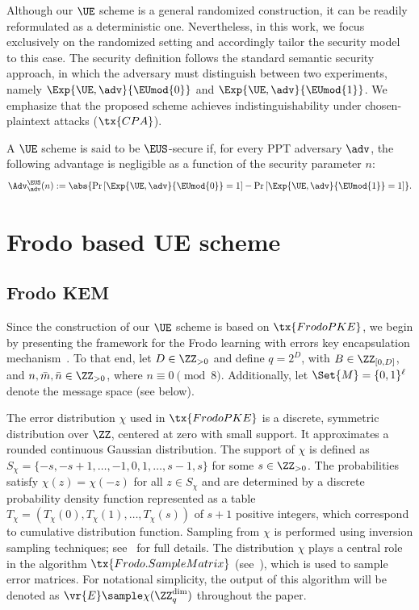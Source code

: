 \documentclass{fundam}
\begin{document}
Although our $\UE$ scheme is a general randomized construction, it can be readily reformulated as a deterministic one. Nevertheless, in this work, we focus exclusively on the randomized setting and accordingly tailor the security model to this case. The security definition follows the standard semantic security approach, in which the adversary must distinguish between two experiments, namely $\Exp{\UE,\adv}{\EUmod{0}}$ and $\Exp{\UE,\adv}{\EUmod{1}}$. We emphasize that the proposed scheme achieves indistinguishability under chosen-plaintext attacks ($\tx{CPA}$).

A $\UE$ scheme is said to be $\EUS$-secure if, for every PPT adversary $\adv$, the following advantage is negligible as a function of the security parameter $n$:
\begin{align*}
	\Adv_{\adv}^{\EUS}(n) := \abs{\Pr\left[ \Exp{\UE,\adv}{\EUmod{0}} = 1 \right] - \Pr\left[ \Exp{\UE,\adv}{\EUmod{1}} = 1 \right]}.
\end{align*}



\section{Frodo based UE scheme}
\subsection{Frodo KEM}\label{sec::Frodo}
Since the construction of our $\UE$ scheme is based on $\tx{FrodoPKE}$, we begin by presenting the framework for the Frodo learning with errors key encapsulation mechanism~\cite{Frodo, Frodo2}. To that end, let $D \in \ZZ_{>0}$ and define $q = 2^D$, with $B \in \ZZ_{[0, D]}$, and $n, \bar{m}, \bar{n} \in \ZZ_{>0}$, where $n \equiv 0 \pmod{8}$. Additionally, let $\Set{M} = \{0,1\}^{\ell}$ denote the message space (see below).


The error distribution $\chi$ used in $\tx{FrodoPKE}$ is a discrete, symmetric distribution over $\ZZ$, centered at zero with small support. It approximates a rounded continuous Gaussian distribution. The support of $\chi$ is defined as $S_{\chi} = \{-s, -s+1, \ldots, -1, 0, 1, \ldots, s-1, s\}$ for some $s \in \ZZ_{>0}$. The probabilities satisfy $\chi(z) = \chi(-z)$ for all $z \in S_{\chi}$ and are determined by a discrete probability density function represented as a table $T_{\chi} = (T_{\chi}(0), T_{\chi}(1), \ldots, T_{\chi}(s))$ of $s+1$ positive integers, which correspond to cumulative distribution function. Sampling from $\chi$ is performed using inversion sampling techniques; see~\cite{Frodo, Frodo2} for full details.
The distribution $\chi$ plays a central role in the algorithm $\tx{Frodo.SampleMatrix}$ (see~\cite{Frodo, Frodo2}), which is used to sample error matrices. For notational simplicity, the output of this algorithm will be denoted as $\vr{E} \sample \chi(\ZZ_q^{\dim})$ throughout the paper.
%
\end{document}
